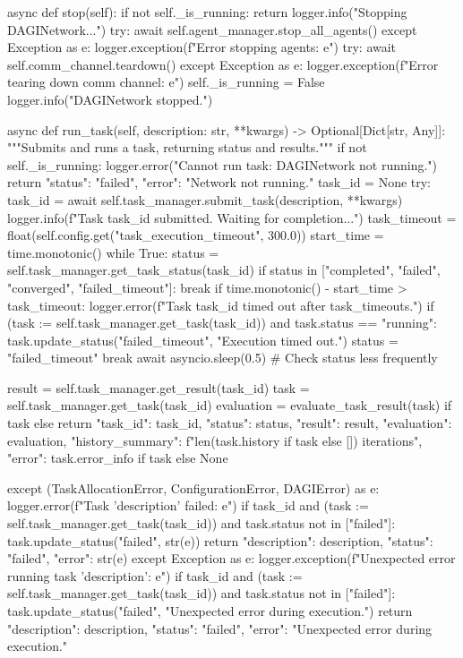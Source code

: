 \documentclass{amsbook}
\theoremstyle{definition}
\theoremstyle{remark}
\numberwithin{equation}{chapter} %
\begin{document}
\begin{python}
    async def stop(self):
        if not self._is_running: return
        logger.info("Stopping DAGINetwork...")
        try: await self.agent_manager.stop_all_agents()
        except Exception as e: logger.exception(f"Error stopping agents: {e}")
        try: await self.comm_channel.teardown()
        except Exception as e: logger.exception(f"Error tearing down comm channel: {e}")
        self._is_running = False
        logger.info("DAGINetwork stopped.")

    async def run_task(self, description: str, **kwargs) -> Optional[Dict[str, Any]]:
         """Submits and runs a task, returning status and results."""
         if not self._is_running:
              logger.error("Cannot run task: DAGINetwork not running.")
              return {"status": "failed", "error": "Network not running."}
         task_id = None
         try:
              task_id = await self.task_manager.submit_task(description, **kwargs)
              logger.info(f"Task {task_id} submitted. Waiting for completion...")
              task_timeout = float(self.config.get("task_execution_timeout", 300.0))
              start_time = time.monotonic()
              while True:
                   status = self.task_manager.get_task_status(task_id)
                   if status in ["completed", "failed", "converged", "failed_timeout"]: break
                   if time.monotonic() - start_time > task_timeout:
                        logger.error(f"Task {task_id} timed out after {task_timeout}s.")
                        if (task := self.task_manager.get_task(task_id)) and task.status == "running":
                             task.update_status("failed_timeout", "Execution timed out.")
                        status = "failed_timeout"
                        break
                   await asyncio.sleep(0.5) # Check status less frequently

              result = self.task_manager.get_result(task_id)
              task = self.task_manager.get_task(task_id)
              evaluation = evaluate_task_result(task) if task else {}
              return {"task_id": task_id, "status": status, "result": result, "evaluation": evaluation, "history_summary": f"{len(task.history if task else [])} iterations", "error": task.error_info if task else None}

         except (TaskAllocationError, ConfigurationError, DAGIError) as e:
              logger.error(f"Task '{description}' failed: {e}")
              if task_id and (task := self.task_manager.get_task(task_id)) and task.status not in ["failed"]: task.update_status("failed", str(e))
              return {"description": description, "status": "failed", "error": str(e)}
         except Exception as e:
             logger.exception(f"Unexpected error running task '{description}': {e}")
             if task_id and (task := self.task_manager.get_task(task_id)) and task.status not in ["failed"]: task.update_status("failed", "Unexpected error during execution.")
             return {"description": description, "status": "failed", "error": "Unexpected error during execution."}


\end{python}
\end{document}
